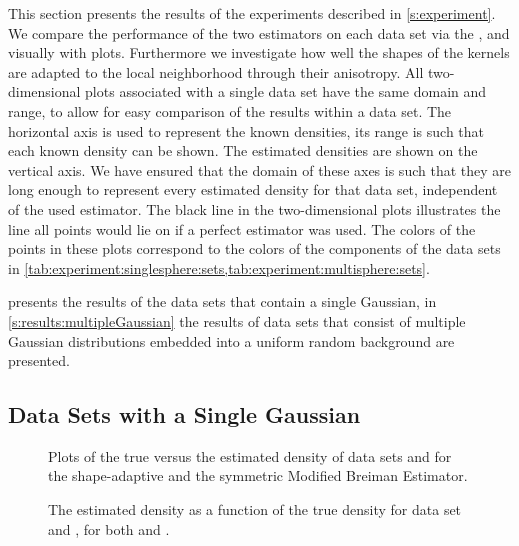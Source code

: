 
This section presents the results of the experiments described in \cref{s:experiment}.
We compare the performance of the two estimators on each data set via the \mse, and visually with plots. Furthermore we investigate how well the shapes of the kernels are adapted to the local neighborhood through their anisotropy.
	All two-dimensional plots associated with a single data set have the same domain and range, to allow for easy comparison of the results within a data set. The horizontal axis is used to represent the known densities, its range is such that each known density can be shown. The estimated densities are shown on the vertical axis. We have ensured that the domain of these axes is such that they are long enough to represent every estimated density for that data set, independent of the used estimator.
	The black line in the two-dimensional plots illustrates the line all points would lie on if a perfect estimator was used.
	The colors of the points in these plots correspond to the colors of the components of the data sets in \cref{tab:experiment:singlesphere:sets,tab:experiment:multisphere:sets}.

	 presents the results of the data sets that contain a single Gaussian, in \cref{s:results:multipleGaussian} the results of data sets that consist of multiple Gaussian distributions embedded into a uniform random background are presented.

\subsection{Data Sets with a Single Gaussian}
\label{s:results:singleGaussian}


	\begin{figure*}[p]
		\centering
		
		\caption{Plots of the true versus the estimated density of data sets \ferdosiTwo and \baakmanTwo for the shape-adaptive and the symmetric Modified Breiman Estimator.}
		\label{fig:results:multiSphere:two:comparativePlots}
	\end{figure*}
	\begin{figure*}[p]
		\centering
		
		\caption{The estimated density as a function of the true density for data set \ferdosiThree and \baakmanThree, for both \mbe and \sambe.}
		\label{fig:results:multiSphere:three:comparativePlots}
	\end{figure*}

